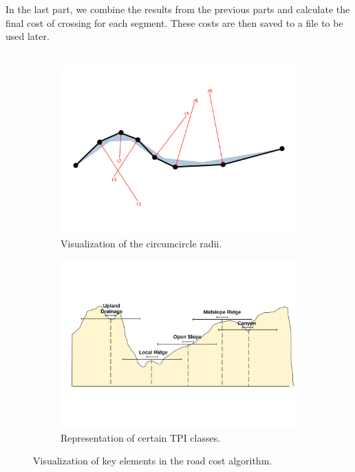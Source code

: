             In the last part, we combine the results from the previous parts and calculate the final cost of crossing for each segment. These costs are then saved to a file to be used later.\\\\
            \begin{figure}[ht]
                \centering
                \begin{subfigure}[b]{0.9\textwidth}
                    \centering
                    \includegraphics[trim={0cm 3.55cm 0cm 2.8cm}, clip, width=\textwidth]{images/path_curvature.pdf}
                    \caption{Visualization of the circumcircle radii.}
                    \label{fig:curvature}
                \end{subfigure}
                \begin{subfigure}[b]{0.9\textwidth}
                    \centering
                    \includegraphics[trim={0cm 5.2cm 0cm 5.2cm}, clip, width=\textwidth]{images/TPI_classification.pdf}
                    \caption{Representation of certain TPI classes.}
                    \label{fig:TPI}
                \end{subfigure}
                \caption{Visualization of key elements in the road cost algorithm.}
            \end{figure}
